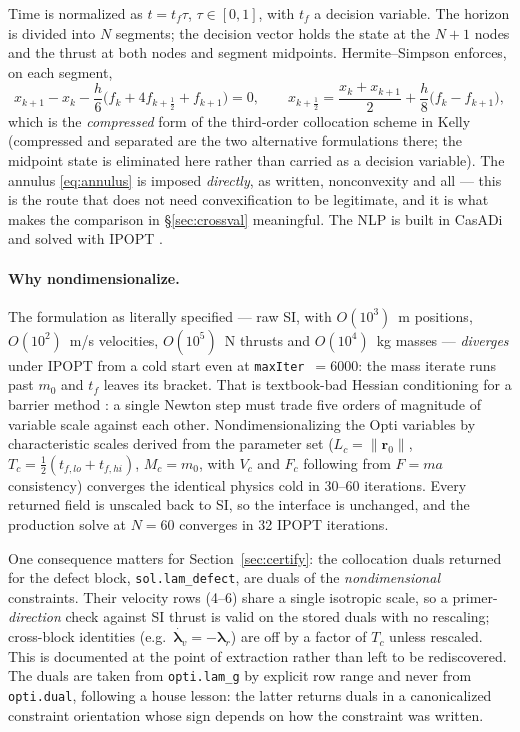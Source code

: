\documentclass[11pt]{article}
\newcommand{\rvec}{\mathbf{r}}
\newcommand{\lamv}{\boldsymbol{\lambda}_v}
\newcommand{\lamr}{\boldsymbol{\lambda}_r}
\begin{document}
Time is normalized as $t = t_f \tau$, $\tau \in [0,1]$, with $t_f$ a
decision variable. The horizon is divided into $N$ segments; the decision
vector holds the state at the $N+1$ nodes and the thrust at both nodes and
segment midpoints. Hermite--Simpson enforces, on each segment,
%
\begin{equation}
x_{k+1} - x_k - \frac{h}{6}\Big( f_k + 4 f_{k+\frac12} + f_{k+1} \Big) = 0,
\qquad
x_{k+\frac12} = \frac{x_k + x_{k+1}}{2} + \frac{h}{8}\big( f_k - f_{k+1} \big),
\label{eq:hs}
\end{equation}
%
which is the \emph{compressed} form of the third-order collocation scheme
in Kelly~\cite{kelly2017} (compressed and separated are the two alternative
formulations there; the midpoint state is eliminated here rather than
carried as a decision variable). The annulus \eqref{eq:annulus} is imposed
\emph{directly}, as written, nonconvexity and all --- this is the route that
does not need convexification to be legitimate, and it is what makes the
comparison in \S\ref{sec:crossval} meaningful. The NLP is built in CasADi
\cite{casadi2019} and solved with IPOPT \cite{ipopt2006}.

\paragraph{Why nondimensionalize.}
The formulation as literally specified --- raw SI, with $O(10^3)$~m
positions, $O(10^2)$~m/s velocities, $O(10^5)$~N thrusts and $O(10^4)$~kg
masses --- \emph{diverges} under IPOPT from a cold start even at
\texttt{maxIter}~$=6000$: the mass iterate runs past $m_0$ and $t_f$ leaves
its bracket. That is textbook-bad Hessian conditioning for a barrier method
\cite{betts2010}: a single Newton step must trade five orders of magnitude
of variable scale against each other. Nondimensionalizing the Opti variables
by characteristic scales derived from the parameter set ($L_c =
\lVert\rvec_0\rVert$, $T_c = \tfrac12 (t_{f,lo}+t_{f,hi})$, $M_c = m_0$,
with $V_c$ and $F_c$ following from $F = ma$ consistency) converges the
identical physics cold in 30--60 iterations. Every returned field is
unscaled back to SI, so the interface is unchanged, and the production solve
at $N = 60$ converges in 32 IPOPT iterations.

One consequence matters for Section~\ref{sec:certify}: the collocation
duals returned for the defect block, \verb|sol.lam_defect|, are duals of the
\emph{nondimensional} constraints. Their velocity rows (4--6) share a single
isotropic scale, so a primer-\emph{direction} check against SI thrust is
valid on the stored duals with no rescaling; cross-block identities (e.g.\
$\dot{\lamv} = -\lamr$) are off by a factor of $T_c$ unless rescaled. This
is documented at the point of extraction rather than left to be
rediscovered. The duals are taken from \verb|opti.lam_g| by explicit row
range and never from \verb|opti.dual|, following a house lesson: the latter
returns duals in a canonicalized constraint orientation whose sign depends
on how the constraint was written.
\end{document}
